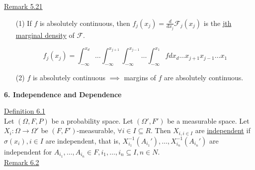 \documentclass[10pt,letterpaper]{article}
\begin{document}
\underline{Remark 5.21}\\

\begin{enumerate}

\item[(1)] If $f$ is absolutely continuous, then $f_j(x_j)=\frac{d}{dx_j}\mathcal{F}_j(x_j)$ is the \underline{jth marginal density} of $\mathcal{F}$.

$$f_j(x_j)=\int_{-\infty}^{x_d}\dots\int_{-\infty}^{x_{j+1}}\int_{-\infty}^{x_{j-1}}\dots\int_{-\infty}^{x_{1}}fdx_d\dots x_{j+1}x_{j-1}\dots x_1$$

\item[(2)] $f$ is absolutely continuous $\implies$ margins of $f$ are absolutely continuous.

\end{enumerate}

\pagebreak

\begin{center}
\textbf{6. Independence and Dependence}
\end{center}

\underline{Definition 6.1}\\

Let $(\Omega, F, P)$ be a probability space. Let $(\Omega', F')$ be a measurable space. Let $X_i:\Omega\rightarrow\Omega'$ be $(F, F')$-measurable, $\forall i\in I\subseteq R$. Then $X_{i, i\in I}$ are \underline{independent} if $\sigma(x_i), i\in I$ are independent, that is, $X_{i_1}^{-1}(A_{i_1}'),\dots,X_{i_n}^{-1}(A_{i_n}')$ are independent for $A_{i_1},\dots,A_{i_n}\in F, {i_1,\dots,i_n}\subseteq I, n\in N$.\\

\underline{Remark 6.2}\\
\end{document}
